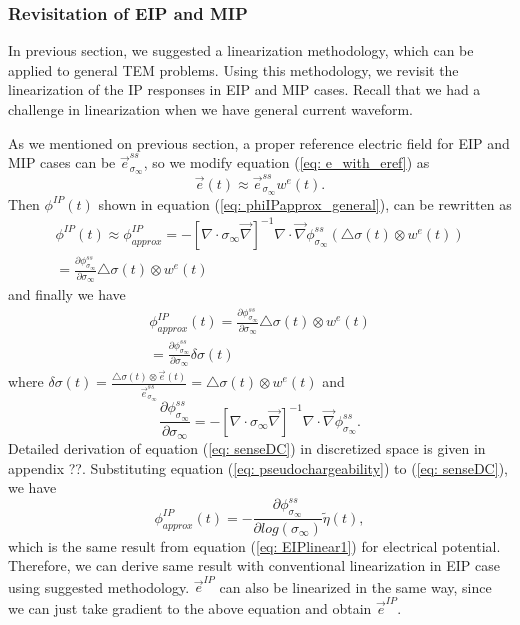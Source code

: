 \documentclass[a4paper, 11pt]{article}
\renewcommand{\div}{\nabla\cdot}
\newcommand{\grad}{\vec \nabla}
\newcommand{\siginf}{\sigma_\infty}
\newcommand{\dsig}{\triangle\sigma}
\newcommand {\e}  { {\vec e} }
\newcommand{\peta}{\tilde{\eta}}
\newcommand{\sigpert}{\delta\sigma}
\begin{document}
\subsubsection{Revisitation of EIP and MIP}
In previous section, we suggested a linearization methodology, which can be applied to general TEM problems. Using this methodology, we revisit the linearization of the IP responses in EIP and MIP cases. Recall that we had a challenge in linearization when we have general current waveform.

As we mentioned on previous section, a proper reference electric field for EIP and MIP cases can be $\e^{ss}_{\siginf}$, so we modify equation (\ref{eq: e_with_eref}) as
\begin{equation*}
    \e(t) \approx \e^{ss}_{\siginf}w^e(t).
\end{equation*}
Then $\phi^{IP}(t)$ shown in equation (\ref{eq: phiIPapprox_general}), can be rewritten as
\begin{eqnarray*}
  \phi^{IP}(t) \approx \phi^{IP}_{approx} =  -[\div\siginf\grad]^{-1}\div\grad\phi^{ss}_{\siginf}(\dsig(t)\otimes w^e(t)) \\
               =\frac{\partial \phi^{ss}_{\siginf}}{\partial \siginf}\dsig(t)\otimes w^e(t)
\end{eqnarray*}
and finally we have
\begin{eqnarray}
    \phi^{IP}_{approx}(t) = \frac{\partial \phi^{ss}_{\siginf}}{\partial \siginf}\dsig(t)\otimes w^e(t) \nonumber\\
                 =\frac{\partial \phi^{ss}_{\siginf}}{\partial \siginf}\sigpert(t)
\end{eqnarray}
where $\sigpert(t) = \frac{\dsig(t)\otimes \e(t)}{\e^{ss}_{\siginf}}=\dsig(t)\otimes w^e(t)$ and
\begin{equation}
    \frac{\partial \phi^{ss}_{\siginf}}{\partial \siginf} = -[\div\siginf\grad]^{-1}\div\grad\phi^{ss}_{\siginf}.
    \label{eq: senseDC}
\end{equation}
Detailed derivation of equation (\ref{eq: senseDC}) in discretized space is given in appendix ??. Substituting equation (\ref{eq: pseudochargeability}) to (\ref{eq: senseDC}), we have
\begin{equation}
    \phi^{IP}_{approx}(t) = -\frac{\partial \phi^{ss}_{\siginf}}{\partial log(\siginf)}\peta(t),
    \label{eq: phiIPapprox}
\end{equation}
which is the same result from equation (\ref{eq: EIPlinear1}) for electrical potential. Therefore, we can derive same result with conventional linearization in EIP case using suggested methodology. $\e^{IP}$ can also be linearized in the same way, since we can just take gradient to the above equation and obtain $\e^{IP}$.
\end{document}
